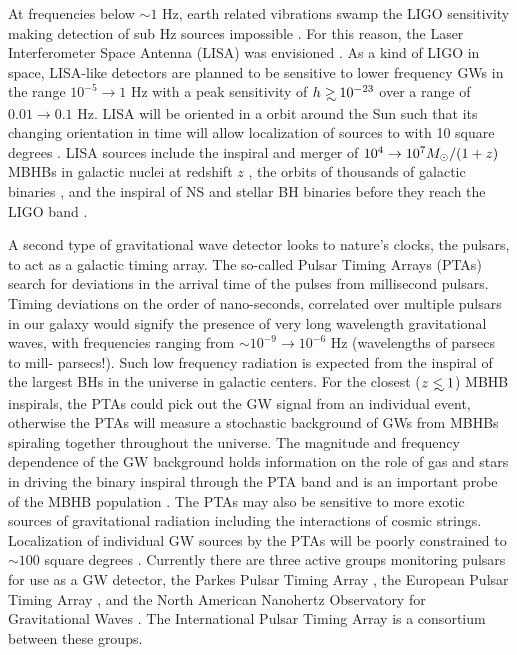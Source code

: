At frequencies below $\sim 1$ Hz, earth related vibrations swamp the LIGO
sensitivity making detection of sub Hz sources impossible \citep{}. For this
reason, the Laser Interferometer Space Antenna (LISA) was envisioned
\citep{LISAbeginnings}.  As a kind of LIGO in space, LISA-like detectors are
planned to be sensitive to lower frequency GWs in the range $10^{-5}
\rightarrow 1$ Hz with a peak sensitivity of $h \gsim 10^{-23}$ over a range
of $0.01 \rightarrow 0.1$ Hz. LISA will be oriented in a orbit around the Sun
such that its changing orientation in time will allow localization of sources
to with 10 square degrees \citep{}. LISA sources include the inspiral and
merger of $10^4 \rightarrow 10^7 {M_{\odot}}/(1+z)$ MBHBs in galactic nuclei at
redshift $z$ \citep{}, the orbits of thousands of galactic binaries \citep{},
and the inspiral of NS and stellar BH binaries before they reach the LIGO band
\citep{Sesana:2016:LIGOLISA and refs therein}.

A second type of gravitational wave detector looks to nature's clocks, the
pulsars, to act as a galactic timing array. The so-called Pulsar Timing Arrays
(PTAs) search for deviations in the arrival time of the pulses from
millisecond pulsars. Timing deviations on the order of nano-seconds,
correlated over multiple pulsars in our galaxy would signify the presence of
very long wavelength gravitational waves, with frequencies ranging from
$\sim10^{-9} \rightarrow 10^{-6}$ Hz (wavelengths of parsecs to mill-
parsecs!). Such low frequency radiation is expected from the inspiral of the
largest BHs in the universe in galactic centers. For the closest ($z\lsim1$)
MBHB inspirals, the PTAs could pick out the GW signal from an individual
event, otherwise the PTAs will measure a stochastic background of GWs from
MBHBs spiraling together throughout the universe. The magnitude and frequency
dependence of the GW background holds information on the role of gas and stars
in driving the binary inspiral through the PTA band and is an important probe
of the MBHB population \citep[\textit{e.g.}][]{}. The PTAs may also be
sensitive to more exotic sources of gravitational radiation including the
interactions of cosmic strings. Localization of individual GW sources by the
PTAs will be poorly constrained to $\sim 100$ square degrees \citep{}.
Currently there are three active groups monitoring pulsars for use as a GW
detector, the Parkes Pulsar Timing Array \citep[PPTA][]{PPTA}, the European
Pulsar Timing Array \citep[EPTA][]{EPTA}, and the North American Nanohertz
Observatory for Gravitational Waves \citep[NANOGrav][]{NANOGrav}. The
International Pulsar Timing Array \citep[iPTA][]{iPTA} is a consortium between
these groups.







